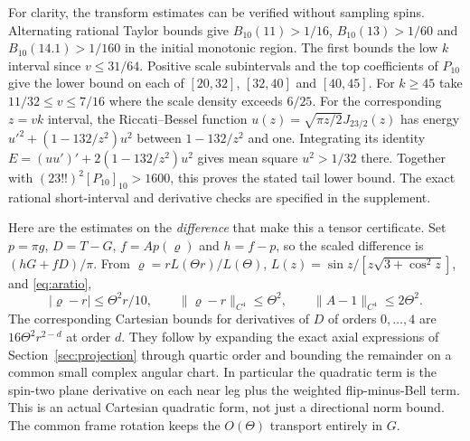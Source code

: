 \documentclass[11pt,a4paper]{article}
\theoremstyle{definition}
\theoremstyle{remark}
\begin{document}
For clarity, the transform estimates can be verified without sampling spins. Alternating rational Taylor bounds give
$B_{10}(11)>1/16$, $B_{10}(13)>1/60$ and
$B_{10}(14.1)>1/160$ in the initial monotonic region. The first bounds the low $k$ interval since $v\le31/64$. Positive scale subintervals and the top coefficients of $P_{10}$ give the lower bound on each of $[20,32]$, $[32,40]$ and $[40,45]$. For $k\ge45$ take $11/32\le v\le7/16$ where the scale density exceeds $6/25$. For the corresponding $z=vk$ interval, the Riccati--Bessel function
$u(z)=\sqrt{\pi z/2}J_{23/2}(z)$ has energy
$u'^2+(1-132/z^2)u^2$ between $1-132/z^2$ and one. Integrating its identity
$E=(uu')'+2(1-132/z^2)u^2$ gives mean square $u^2>1/32$ there. Together with $(23!!)^2[P_{10}]_{10}>1600$, this proves the stated tail lower bound. The exact rational short-interval and derivative checks are specified in the supplement.

Here are the estimates on the \emph{difference} that make this a tensor certificate. Set $p=\pi g$, $D=T-G$, $f=A p(\varrho)$ and $h=f-p$, so the scaled difference is $(hG+fD)/\pi$. From
$\varrho=rL(\Theta r)/L(\Theta)$,
$L(z)=\sin z/[z\sqrt{3+\cos^2z}]$, and \eqref{eq:aratio},
\[
 |\varrho-r|\le\Theta^2r/10,\qquad
 \|\varrho-r\|_{C^4}\le\Theta^2,\qquad
 \|A-1\|_{C^4}\le2\Theta^2.
\]
The corresponding Cartesian bounds for derivatives of $D$ of orders $0,\ldots,4$ are $16\Theta^2 r^{2-d}$ at order $d$. They follow by expanding the exact axial expressions of Section~\ref{sec:projection} through quartic order and bounding the remainder on a common small complex angular chart. In particular the quadratic term is the spin-two plane derivative on each near leg plus the weighted flip-minus-Bell term. This is an actual Cartesian quadratic form, not just a directional norm bound. The common frame rotation keeps the $O(\Theta)$ transport entirely in $G$.
\end{document}
